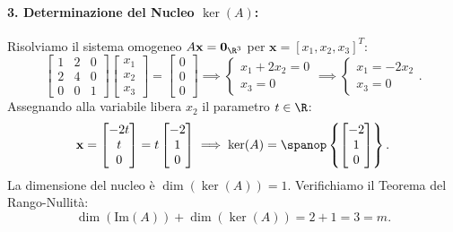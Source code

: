 \begin{example}
\paragraph{3. Determinazione del Nucleo $\ker(A)$:}
Risolviamo il sistema omogeneo $A\mathbf{x} = \mathbf{0}_{\R^3}$ per $\mathbf{x} = [x_1, x_2, x_3]^T$:
\begin{equation}
    \begin{bmatrix} 1 & 2 & 0 \\ 2 & 4 & 0 \\ 0 & 0 & 1 \end{bmatrix} \begin{bmatrix} x_1 \\ x_2 \\ x_3 \end{bmatrix} = \begin{bmatrix} 0 \\ 0 \\ 0 \end{bmatrix} \implies \begin{cases} x_1 + 2x_2 = 0 \\ x_3 = 0 \end{cases} \implies \begin{cases} x_1 = -2x_2 \\ x_3 = 0 \end{cases}.
\end{equation}
Assegnando alla variabile libera $x_2$ il parametro $t \in \R$:
\begin{equation}
    \mathbf{x} = \begin{bmatrix} -2t \\ t \\ 0 \end{bmatrix} = t \begin{bmatrix} -2 \\ 1 \\ 0 \end{bmatrix} \implies \ker(A) = \spanop\left\{ \begin{bmatrix} -2 \\ 1 \\ 0 \end{bmatrix} \right\}.
\end{equation}
La dimensione del nucleo \`e $\dim(\ker(A)) = 1$. Verifichiamo il Teorema del Rango-Nullit\`a:
\begin{equation}
    \dim(\mathrm{Im}(A)) + \dim(\ker(A)) = 2 + 1 = 3 = m.
\end{equation}
\end{example}

